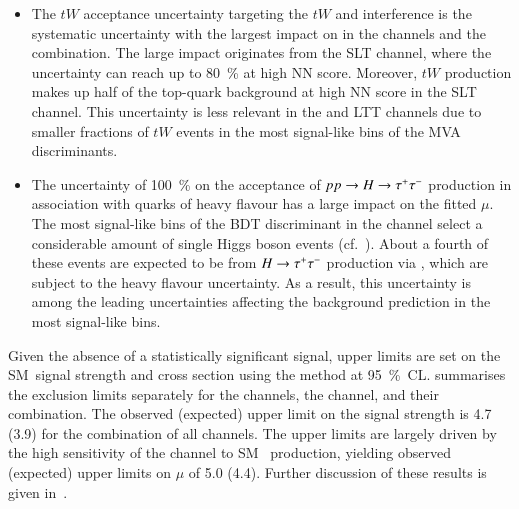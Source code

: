 \begin{itemize}
\item The $tW$ acceptance uncertainty targeting the $tW$ and \ttbar interference
  is the systematic uncertainty with the largest impact on \muhat in the \lephad
  channels and the combination. The large impact originates from the \lephad SLT
  channel, where the uncertainty can reach up to \SI{80}{\percent} at high NN
  score. Moreover, $tW$ production makes up half of the top-quark background at
  high NN score in the \lephad SLT channel. This uncertainty is less relevant in
  the \hadhad and \lephad LTT channels due to smaller fractions of $tW$ events
  in the most signal-like bins of the MVA discriminants.

\item The uncertainty of \SI{100}{\percent} on the acceptance of
  $pp \to H \to \tau^{+} \tau^{-}$ production in association with quarks of heavy flavour
  has a large impact on the fitted $\mu$. The most signal-like bins of the BDT
  discriminant in the \hadhad channel select a considerable amount of single
  Higgs boson events (cf.~). About a
  fourth of these events are expected to be from $H \to \tau^{+} \tau^{-}$ production via
  \ggF, which are subject to the heavy flavour uncertainty. As a result, this
  uncertainty is among the leading uncertainties affecting the background
  prediction in the most signal-like bins.

\end{itemize}
%

Given the absence of a statistically significant signal, upper limits are set on
the SM~\HH signal strength and cross section using the \CLs method at
\SI{95}{\percent}~CL.  summarises the exclusion
limits separately for the \lephad channels, the \hadhad channel, and their
combination. The observed (expected) upper limit on the signal strength is
\num{4.7} (\num{3.9}) for the combination of all channels. The upper limits are
largely driven by the high sensitivity of the \hadhad channel to SM~\HH
production, yielding observed (expected) upper limits on $\mu$ of \num{5.0}
(\num{4.4}). Further discussion of these results is given
in~.


